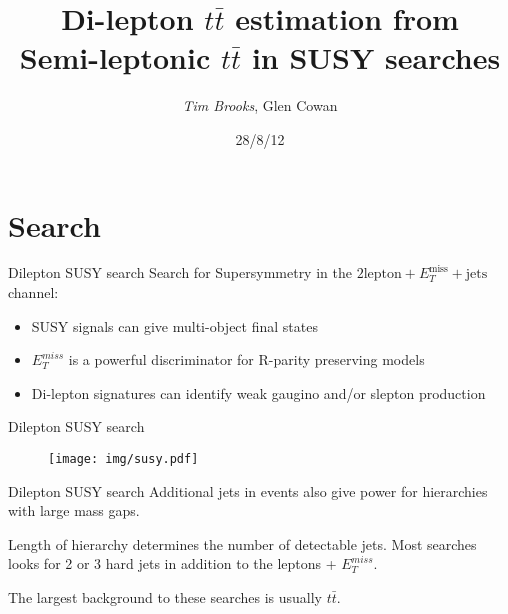 \documentclass{beamer}
\title[Dilepton $t \bar{t}$ estimation\hspace{14em}\insertframenumber/18]{Di-lepton $t \bar{t}$ estimation from \\ Semi-leptonic $t \bar{t}$ in SUSY searches}
\author{\emph{Tim Brooks}, Glen Cowan}
\institute{Royal Holloway University of London}
\date{28/8/12}
\begin{document}
\begin{frame}
\titlepage
\end{frame}

\section{Search}
\begin{frame}{Dilepton SUSY search}
Search for Supersymmetry in the $2 \text{lepton} + E_{T}^{\text{miss}} + \text{jets}$ channel:
  \begin{itemize}
    \item SUSY signals can give multi-object final states
    \item $E_{T}^{miss}$ is a powerful discriminator for R-parity preserving models
    \item Di-lepton signatures can identify weak gaugino and/or slepton production
  \end{itemize}
\end{frame}

\begin{frame}{Dilepton SUSY search}
  \begin{figure}
    \centering
    \texttt{[image: img/susy.pdf]}
  \end{figure}
\end{frame}

\begin{frame}{Dilepton SUSY search}
Additional jets in events also give power for hierarchies with large mass gaps.

Length of hierarchy determines the number of detectable jets. Most searches looks for 2 or 3 hard jets in addition to the leptons + $E_{T}^{miss}$.

The largest background to these searches is usually $t\bar{t}$.
\end{frame}

%
%
\end{document}
